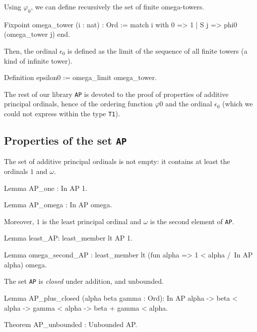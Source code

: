 \documentclass[a4paper]{book}
\begin{document}
{Using $\varphi_0$, we can define recursively the set of finite omega-towers.


\begin{Coqsrc}
Fixpoint omega_tower (i : nat) : Ord :=
  match i with
    0 =>  1
  | S j => phi0 (omega_tower j)
  end.
\end{Coqsrc}

\label{sect:epsilon0-as-limit}
Then, the ordinal  $\epsilon_0$ is defined as the limit of the sequence of all finite towers (a kind of infinite tower).

\begin{Coqsrc}
Definition epsilon0 := omega_limit omega_tower.
\end{Coqsrc}

The rest of our library \texttt{AP} is devoted to the proof of properties of additive principal ordinals, hence of the ordering function  $\varphi0$ and the ordinal $\epsilon_0$ (which we could not express within the type \texttt{T1}).

\subsection{Properties of the set  \texttt{AP}}

The set of additive principal ordinals is not empty: it contains at least the ordinals  $1$ and  $\omega$. 

\begin{Coqsrc}
Lemma AP_one : In AP 1.

Lemma AP_omega : In AP omega.
\end{Coqsrc}

Moreover, $1$ is the least principal ordinal and $\omega$ is the second element of
\texttt{AP}.


\begin{Coqsrc}
Lemma least_AP: least_member  lt AP 1. 

Lemma omega_second_AP :
  least_member   lt 
                  (fun alpha => 1 < alpha /\ In AP alpha)
                  omega.
\end{Coqsrc}

The set  \texttt{AP} is  \emph{closed} under addition, and unbounded.

\begin{Coqsrc}
Lemma AP_plus_closed (alpha beta gamma : Ord): 
     In AP alpha -> beta < alpha -> gamma < alpha -> beta + gamma < alpha.

Theorem AP_unbounded : Unbounded AP.
\end{Coqsrc}

}
\end{document}
